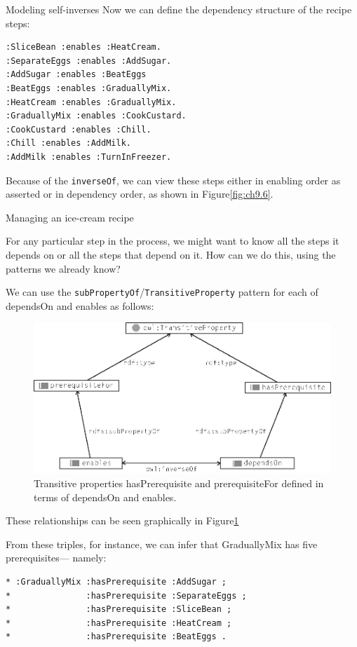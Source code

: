 \begin{challenge}{Modeling self-inverses}
Now we can define the dependency structure of the recipe steps:

\begin{lstlisting}
:SliceBean :enables :HeatCream.
:SeparateEggs :enables :AddSugar.
:AddSugar :enables :BeatEggs
:BeatEggs :enables :GraduallyMix.
:HeatCream :enables :GraduallyMix.
:GraduallyMix :enables :CookCustard.
:CookCustard :enables :Chill.
:Chill :enables :AddMilk.
:AddMilk :enables :TurnInFreezer.
\end{lstlisting}

Because of the \texttt{inverseOf}, we can view these steps either in enabling
order as asserted or in dependency order, as shown in Figure\ref{fig:ch9.6}.

\begin{challenge}{Managing an ice-cream recipe}

For any particular step in the process, we might want to know all the
steps it depends on or all the steps that depend on it. How can we do
this, using the patterns we already know?

\solution

We can use the \texttt{subPropertyOf}/\texttt{TransitiveProperty} pattern for each of
dependsOn and
enables as follows:

\begin{figure}
\centering
\includegraphics[width=5in]{media/ch9/f09-007.eps}
\caption{Transitive properties hasPrerequisite and prerequisiteFor defined in
terms of dependsOn and enables.
}
\label{fig:ch9.7}
\end{figure}



These relationships can be seen graphically in Figure\ref{fig:ch9.7}

From these triples, for instance, we can infer that GraduallyMix has
five prerequisites---
namely:

\begin{lstlisting}
* :GraduallyMix :hasPrerequisite :AddSugar ;
*               :hasPrerequisite :SeparateEggs ;
*               :hasPrerequisite :SliceBean ;
*               :hasPrerequisite :HeatCream ;
*               :hasPrerequisite :BeatEggs .
\end{lstlisting}
\end{challenge}



\end{challenge}
